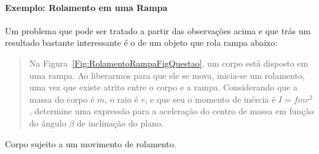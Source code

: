 \paragraph{Exemplo: Rolamento em uma Rampa}

Um problema que pode ser tratado a partir das observações acima e que trás um resultado bastante interessante é o de um objeto que rola rampa abaixo:
\begin{quote}
    Na Figura~\ref{Fig:RolamentoRampaFigQuestao}, um corpo está disposto em uma rampa. Ao liberarmos para que ele se mova, inicia-se um rolamento, uma vez que existe atrito entre o corpo e a rampa. Considerando que a massa do corpo é $m$, o raio é $r$, e que seu o momento de inércia é $I = f mr^2$, determine uma expressão para a aceleração do centro de massa em função do ângulo $\beta$ de inclinação do plano.
\end{quote}

\begin{marginfigure}[-2cm]
\centering
{}
\caption{Corpo sujeito a um movimento de rolamento.\label{Fig:RolamentoRampaFigQuestao}}
\end{marginfigure}


